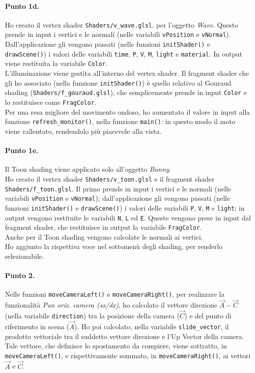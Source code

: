\documentclass[a4paper, 12pt]{article}
\begin{document}
\paragraph{Punto 1d.}
Ho creato il vertex shader \texttt{Shaders/v\_wave.glsl}, per l'oggetto \textit{Wave}. Questo prende in input i vertici e le normali (nelle variabili \texttt{vPosition} e \texttt{vNormal}). Dall'applicazione gli vengono passati (nelle funzioni \texttt{initShader()} e \texttt{drawScene()}) i valori delle variabili \texttt{time}, \texttt{P}, \texttt{V}, \texttt{M}, \texttt{light} e \texttt{material}. In output viene restituita la variabile \texttt{Color}.\\
L'illuminazione viene gestita all'interno del vertex shader. Il fragment shader che gli ho associato (nella funzione \texttt{initShader()}) è quello relativo al Gouraud shading (\texttt{Shaders/\allowbreak f\_gouraud.glsl}), che semplicemente prende in input \texttt{Color} e lo restituisce come \texttt{FragColor}.\\
Per una resa migliore del movimento ondoso, ho  aumentato il valore in input alla funzione \texttt{refresh\_monitor()}, nella funzione \texttt{main()}: in questo modo il moto viene rallentato, rendendolo più piacevole alla vista.

\paragraph{Punto 1e.}
Il Toon shading viene applicato solo all'oggetto \textit{Bunny}.\\
Ho creato il vertex shader \texttt{Shaders/v\_toon.glsl} e il fragment shader \texttt{Shaders/\allowbreak f\_toon.glsl}. Il primo prende in input i vertici e le normali (nelle variabili \texttt{vPosition} e \texttt{vNormal}); dall'applicazione gli vengono passati (nelle funzioni \texttt{initShader()} e \texttt{drawScene()}) i valori delle variabili \texttt{P}, \texttt{V}, \texttt{M} e \texttt{light}; in output vengono restituite le variabili \texttt{N}, \texttt{L} ed \texttt{E}. Queste vengono prese in input dal fragment shader, che restituisce in output la variabile \texttt{FragColor}.\\
Anche per il Toon shading vengono calcolate le normali ai vertici.\\
Ho aggiunto la rispettiva voce nel sottomenù degli shading, per renderlo selezionabile.

\paragraph{Punto 2.}
Nelle funzioni \texttt{moveCameraLeft()} e \texttt{moveCameraRight()}, per realizzare la funzionalità \textit{Pan oriz. camera (sx/dx)}, ho calcolato il vettore direzione $\vec{A} - \vec{C}$ (nella variabile \texttt{direction}) tra la posizione della camera ($\vec{C}$) e del punto di riferimento in scena ($\vec{A}$). Ho poi calcolato, nella variabile \texttt{slide\_vector}, il prodotto vettoriale tra il suddetto vettore direzione e l'Up Vector della camera. Tale vettore, che definisce lo spostamento da compiere, viene sottratto, in \texttt{moveCameraLeft()}, e rispettivamente sommato, in \texttt{moveCameraRight()}, ai vettori $\vec{A}$ e $\vec{C}$.
\end{document}
